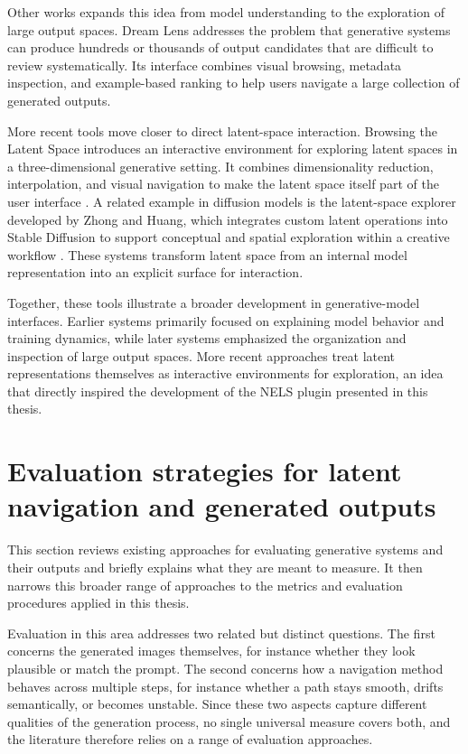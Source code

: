 Other works expands this idea from model understanding to the exploration of large output spaces. Dream Lens addresses the problem that generative systems can produce hundreds or thousands of output candidates that are difficult to review systematically. Its interface combines visual browsing, metadata inspection, and example-based ranking to help users navigate a large collection of generated outputs. \cite{matejka2018dreamlens}

More recent tools move closer to direct latent-space interaction. Browsing the Latent Space introduces an interactive environment for exploring latent spaces in a three-dimensional generative setting. It combines dimensionality reduction, interpolation, and visual navigation to make the latent space itself part of the user interface \cite{cabezon2023browsing}. A related example in diffusion models is the latent-space explorer developed by Zhong and Huang, which integrates custom latent operations into Stable Diffusion to support conceptual and spatial exploration within a creative workflow \cite{zhong2025latentdiffusion}. These systems transform latent space from an internal model representation into an explicit surface for interaction.

Together, these tools illustrate a broader development in generative-model interfaces. Earlier systems primarily focused on explaining model behavior and training dynamics, while later systems emphasized the organization and inspection of large output spaces. More recent approaches treat latent representations themselves as interactive environments for exploration, an idea that directly inspired the development of the NELS plugin presented in this thesis.

\section{Evaluation strategies for latent navigation and generated outputs}\label{sec:3.3}

This section reviews existing approaches for evaluating generative systems and their outputs and briefly explains what they are meant to measure. It then narrows this broader range of approaches to the metrics and evaluation procedures applied in this thesis.

Evaluation in this area addresses two related but distinct questions. The first concerns the generated images themselves, for instance whether they look plausible or match the prompt. The second concerns how a navigation method behaves across multiple steps, for instance whether a path stays smooth, drifts semantically, or becomes unstable. Since these two aspects capture different qualities of the generation process, no single universal measure covers both, and the literature therefore relies on a range of evaluation approaches.

